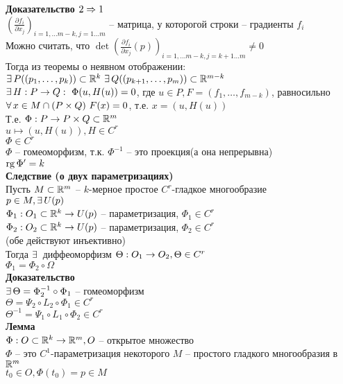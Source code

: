 \documentclass[12pt]{article}
\newcommand{\ppart}[2]{\frac{\partial #1}{\partial #2}}
\begin{document}
\textbf{Доказательство $2 \Rightarrow 1$}\\
$(\ppart{f_i}{x_j})_{i=1,\ldots m-k, j=1\ldots m}$ -- матрица, у которогой строки -- градиенты $f_i$\\
Можно считать, что $\det(\ppart{f_i}{x_j}(p))_{i=1,\ldots m-k, j={k+1}\ldots m} \neq 0$\\
Тогда из теоремы о неявном отображении:\\
$\exists\, P((p_1,\ldots, p_k)) \subset \mathbb{R}^k\ \exists\, Q((p_{k+1}, \ldots, p_m))\subset \mathbb{R}^{m-k}$\\
$\exists\, H: P \rightarrow Q:\ \Phi(u, H(u)) = 0$, где $u \in P, F=(f_1,\ldots, f_{m-k})$, равносильно $\fall x \in M\cap (P\times Q)\ F(x)=0$, т.е. $x=(u, H(u))$\\
Т.е. $\Phi: P\rightarrow P\times Q \subset \mathbb{R}^m$\\
$u\mapsto (u, H(u)), H\in C^r$\\
$\Phi \in C^r$\\
$\Phi$ -- гомеоморфизм, т.к. $\Phi^{-1}$ -- это проекция(а она непрерывна)\\
$\operatorname{rg} \Phi' = k$\\
\textbf{Следствие (о двух параметризациях)}\\
Пусть $M \subset \mathbb{R}^m$ -- $k$-мерное простое $C^r$-гладкое многообразие\\
$p\in M, \exists\, U(p)$\\
$\Phi_1: O_1\subset \mathbb{R}^k \rightarrow U(p)$ -- параметризация, $\Phi_1 \in C^r$\\
$\Phi_2: O_2\subset \mathbb{R}^k \rightarrow U(p)$ -- параметризация, $\Phi_2 \in C^r$\\
(обе действуют инъективно)\\
Тогда $\exists\,$ диффеоморфизм $\Theta: O_1 \rightarrow O_2, \Theta \in C^r$\\
$\Phi_1 = \Phi_2\circ \Omega$\\
\textbf{Доказательство}\\
$\exists\, \Theta = \Phi_2^{-1}\circ \Phi_1$ -- гомеоморфизм\\
$\Theta=\Psi_2\circ L_2\circ \Phi_1\in C^r$\\
$\Theta^{-1} = \Psi_1 \circ L_1 \circ \Phi_2 \in C^r$\\
\textbf{Лемма}\\
$\Phi: O\subset \mathbb{R}^k \rightarrow \mathbb{R}^m, O$ -- открытое множество\\
$\Phi$ -- это $C^1$-параметризация некоторого $M$ -- простого гладкого многообразия в $\mathbb{R}^m$\\
$t_0 \in O, \Phi(t_0) = p\in M$\\
\end{document}

